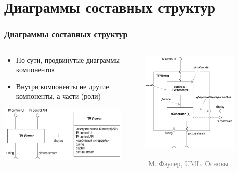 \documentclass[xetex,mathserif,serif]{beamer}
\newcommand{\attribution}[1] {
	\vspace{-5mm}\begin{flushright}\begin{scriptsize}\textcolor{gray}{\textcopyright\, #1}\end{scriptsize}\end{flushright}
}
\begin{document}
	\section{Диаграммы составных структур}

	\begin{frame}
		\frametitle{Диаграммы составных структур}
		\begin{columns}
			\begin{column}{0.5\textwidth}
				\begin{itemize}
					\item По сути, продвинутые диаграммы компонентов
					\item Внутри компоненты не другие компоненты, а части (роли)
				\end{itemize}
				\vspace{3mm}
				\begin{center}
					\includegraphics[width=0.9\textwidth]{compositeStructureElement.png}
				\end{center}
			\end{column}
			\begin{column}{0.5\textwidth}
				\begin{center}
					\includegraphics[width=0.8\textwidth]{compositeStructureDiagram.png}
					\attribution{М. Фаулер, UML. Основы}
				\end{center}
			\end{column}
		\end{columns}
	\end{frame}
\end{document}
